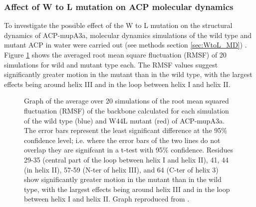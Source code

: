 		\subsubsection{Affect of W to L mutation on ACP molecular dynamics}
		\label{sec:WtoLMD}
		To investigate the possible effect of the W to L mutation on the structural dynamics of ACP-mupA3a, molecular dynamics simulations of the wild type and mutant ACP in water were carried out (see methods section \ref{sec:WtoL_MD}) . Figure \ref{fig:MDacp} shows the averaged root mean square fluctuation (RMSF) of 20 simulations for wild and mutant type each. The RMSF values suggest significantly greater motion in the mutant than in the wild type, with the largest effects being around helix III and in the loop between helix I and helix II.
				
			\setlength\fboxsep{5pt}
			\setlength\fboxrule{1.5pt}
			\begin{figure}[]
			\centering
			\caption[Graph of the average over 20 simulations of the root mean squared fluctuation (RMSF) of the backbone calculated for each simulation of the wild type (blue) and W44L mutant (red) of ACP-mupA3a.]{Graph of the average over 20 simulations of the root mean squared fluctuation (RMSF) of the backbone calculated for each simulation of the wild type (blue) and W44L mutant (red) of ACP-mupA3a. The error bars represent the least significant difference at the 95\% confidence level; i.e. where the error bars of the two lines do not overlap they are signifcant in a t-test with 95\% confidence. Residues 29-35 (central part of the loop between helix I and helix II), 41, 44 (in helix II), 57-59 (N-ter of helix III), and 64 (C-ter of helix 3) show significantly greater motion in the mutant than in the wild type, with the largest effects being around helix III and in the loop between helix I and helix II. Graph reproduced from \textcite{Haines2013}.}
			\label{fig:MDacp}
			\end{figure}			

